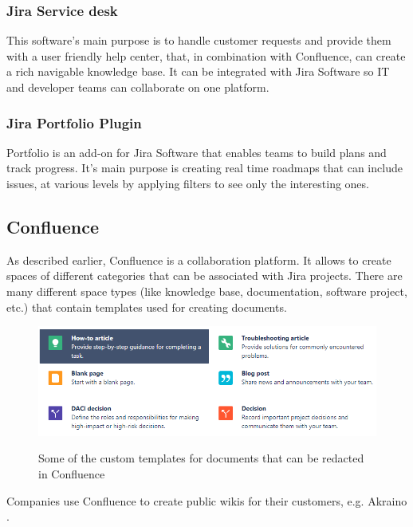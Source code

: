 		\subsubsection{Jira Service desk}\label{subsec:service_desk}
			This software's main purpose is to handle customer requests and provide them with a user friendly help center, that, in combination with Confluence, can create a rich navigable knowledge base.
			It can be integrated with Jira Software so IT and developer teams can collaborate on one platform.

		\subsubsection{Jira Portfolio Plugin}\label{subsec:portfolio}
			Portfolio \cite{portfolio} is an add-on for Jira Software that enables teams to build plans and track progress.
			It's main purpose is creating real time roadmaps that can include issues, at various levels by applying filters to see only the interesting ones. 
		
	\subsection{Confluence}
		As described earlier, Confluence is a collaboration platform.
		It allows to create spaces of different categories that can be associated with Jira projects.
		There are many different space types (like knowledge base, documentation, software project, etc.) that contain templates used for creating documents.
		\begin{figure}[H]
			\centering
			\includegraphics[width=\textwidth]{resources/Annotation2019-07-24180136}\\
			\caption[Some custom templates for Confluence documents]{Some of the custom templates for documents that can be redacted in Confluence}
		\end{figure}
		Companies use Confluence to create public wikis for their customers, e.g. Akraino \cite{akraino}.
		
